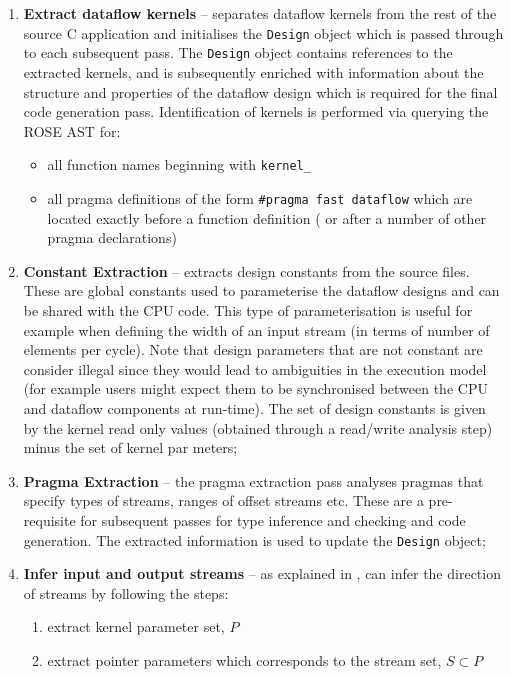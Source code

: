 \begin{enumerate}
\item \textbf{Extract dataflow kernels} -- separates \FAST{} dataflow
  kernels from the rest of the source C application and initialises
  the \texttt{Design} object which is passed through to each
  subsequent pass. The \texttt{Design} object contains references to
  the extracted kernels, and is subsequently enriched with information
  about the structure and properties of the dataflow design which is
  required for the final code generation pass. Identification of
  kernels is performed via querying the ROSE AST for:
\begin{itemize}
  \item all function names beginning with \texttt{kernel\_}
  \item all pragma definitions of the form \texttt{\#pragma fast
      dataflow} which are located exactly before a function definition (
    or after a number of other pragma declarations)
\end{itemize}
\item \textbf{Constant Extraction} -- extracts design constants from
  the source files. These are global constants used to parameterise
  the \FAST{} dataflow designs and can be shared with the CPU
  code. This type of parameterisation is useful for example when
  defining the width of an input stream (in terms of number of
  elements per cycle). Note that design parameters that are not
  constant are consider illegal since they would lead to ambiguities
  in the execution model (for example users might expect them to be
  synchronised between the CPU and dataflow components at
  run-time). The set of design constants is given by the kernel read
  only values (obtained through a read/write analysis step) minus the
  set of kernel par meters;
\item \textbf{Pragma Extraction} -- the pragma extraction pass
  analyses pragmas that specify types of streams, ranges of offset
  streams etc. These are a pre-requisite for subsequent passes for
  type inference and checking and code generation. The extracted
  information is used to update the \texttt{Design} object;
\item \textbf{Infer input and output streams} -- as explained in
  , \fastc{} can infer the direction of
  streams by following the steps:
\begin{enumerate}
\item extract kernel parameter set, $P$
\item extract pointer parameters which corresponds to the stream set, $ S \subset P $

\end{enumerate}
\end{enumerate}
